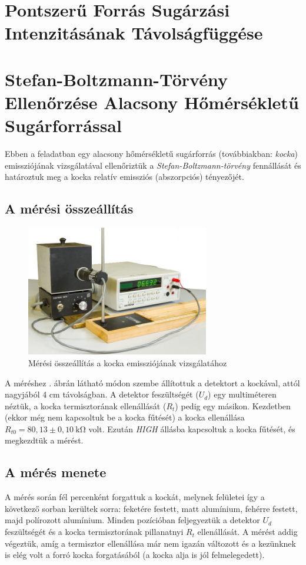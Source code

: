 \documentclass[a4paper, 12pt]{article}
\begin{document}
    \section[Intenzitás Távolságfüggése]{Pontszerű Forrás Sugárzási Intenzitásának Távolságfüggése}

    
    \section[Alacsony Hőmérsékletű Sugárforrás]{Stefan-Boltzmann-Törvény Ellenőrzése Alacsony Hőmérsékletű Sugárforrással}
    Ebben a feladatban egy alacsony hőmérsékletű sugárforrás (továbbiakban: \textit{kocka}) emissziójának vizsgálatával ellenőriztük a \textit{Stefan-Boltzmann-törvény} fennállását és határoztuk meg a kocka relatív emissziós (abszorpciós) tényezőjét.

    \subsection{A mérési összeállítás}
    \begin{figure}[H]
        \centering
        \includegraphics[width=8cm]{632px-Homsug5}
        \caption{Mérési összeállítás a kocka emissziójának vizsgálatához}
        \label{fig:4ossze}
    \end{figure}

    A méréshez . ábrán látható módon szembe állítottuk a detektort a kockával, attól nagyjából 4 cm távolságban.
    A detektor feszültségét ($U_d$) egy multiméteren néztük, a kocka termisztorának ellenállását ($R_t$) pedig egy másikon.
    Kezdetben (ekkor még nem kapcsoltuk be a kocka fűtését) a kocka ellenállása $R_{t0}=80,13\pm 0,10~\mathrm{k\Omega}$ volt.
    Ezután \textit{HIGH} állásba kapcsoltuk a kocka fűtését, és megkezdtük a mérést.

    \subsection{A mérés menete}
    A mérés során fél percenként forgattuk a kockát, melynek felületei így a következő sorban kerültek sorra: feketére festett, matt alumínium, fehérre festett, majd polírozott alumínium.
    Minden pozícióban feljegyeztük a detektor $U_d$ feszültségét és a kocka termisztorának pillanatnyi $R_t$ ellenállását.
    A mérést addig végeztük, amíg a termisztor ellenállása már nem igazán változott és a kezünknek is elég volt a forró kocka forgatásából (a kocka alja is jól felmelegedett).
\end{document}
